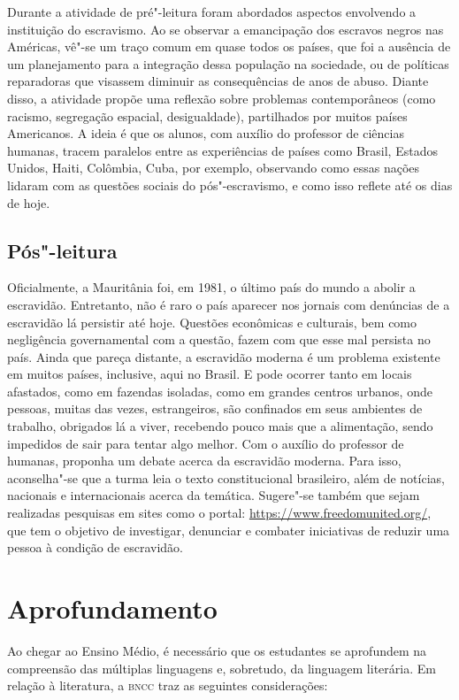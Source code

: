 \documentclass[12pt]{extarticle}
\begin{document}
Durante a atividade de pré"-leitura foram abordados aspectos
envolvendo a instituição do escravismo. Ao se observar a emancipação dos
escravos negros nas Américas, vê"-se um traço comum em quase todos os
países, que foi a ausência de um planejamento para a integração dessa
população na sociedade, ou de políticas reparadoras que visassem
diminuir as consequências de anos de abuso. Diante disso, a atividade
propõe uma reflexão sobre problemas contemporâneos (como racismo,
segregação espacial, desigualdade), partilhados por muitos países
Americanos. A ideia é que os alunos, com auxílio do professor de
ciências humanas, tracem paralelos entre as experiências de países como
Brasil, Estados Unidos, Haiti, Colômbia, Cuba, por exemplo, observando
como essas nações lidaram com as questões sociais do pós"-escravismo, e
como isso reflete até os dias de hoje.

\subsection{Pós"-leitura}

Oficialmente, a Mauritânia foi, em 1981, o último país do
mundo a abolir a escravidão. Entretanto, não é raro o país aparecer nos
jornais com denúncias de a escravidão lá persistir até hoje. Questões
econômicas e culturais, bem como negligência governamental com a
questão, fazem com que esse mal persista no país. Ainda que pareça
distante, a escravidão moderna é um problema existente em muitos países,
inclusive, aqui no Brasil. E pode ocorrer tanto em locais afastados,
como em fazendas isoladas, como em grandes centros urbanos, onde
pessoas, muitas das vezes, estrangeiros, são confinados em seus
ambientes de trabalho, obrigados lá a viver, recebendo pouco mais que a
alimentação, sendo impedidos de sair para tentar algo melhor. Com o
auxílio do professor de humanas, proponha um debate acerca da escravidão
moderna. Para isso, aconselha"-se que a turma leia o texto constitucional
brasileiro, além de notícias, nacionais e internacionais acerca da
temática. Sugere"-se também que sejam realizadas pesquisas em sites como
o portal:
\url{https://www.freedomunited.org/}, que tem o objetivo de investigar, denunciar e combater iniciativas de reduzir uma pessoa à condição de escravidão.

\section{Aprofundamento}

Ao chegar ao Ensino Médio, é necessário que os estudantes se aprofundem
na compreensão das múltiplas linguagens e, sobretudo, da linguagem
literária. Em relação à literatura, a \textsc{bncc} traz as seguintes
considerações:
\end{document}
